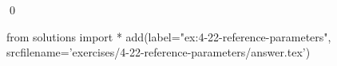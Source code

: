 
\begin{ex}
  \label{ex:4-22-reference-parameters}
  
  \qed
\end{ex}
\begin{python0}
from solutions import *
add(label="ex:4-22-reference-parameters",
    srcfilename='exercises/4-22-reference-parameters/answer.tex')
\end{python0}
